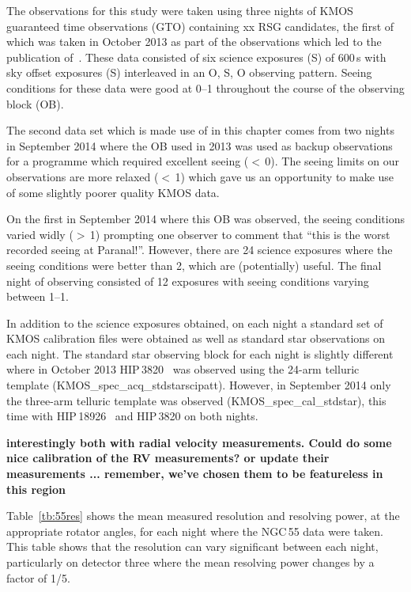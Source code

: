 The observations for this study were taken using three nights of KMOS guaranteed time observations (GTO) containing xx RSG candidates, the first of which was taken in October 2013 as part of the observations which led to the publication of~\cite{2015ApJ...805..182G}.
These data consisted of six science exposures (S) of 600\,s with sky offset exposures (S) interleaved in an O, S, O observing pattern.
Seeing conditions for these data were good at 0--1 throughout the course of the observing block (OB).

The second data set which is made use of in this chapter comes from two nights in September 2014 where the OB used in 2013 was used as backup observations for a programme which required excellent seeing ($<$\,0).
The seeing limits on our observations are more relaxed ($<$\,1) which gave us an opportunity to make use of some slightly poorer quality KMOS data.

On the first in September 2014 where this OB was observed, the seeing conditions varied widly ($>$\,1) prompting one observer to comment that ``this is the worst recorded seeing at Paranal!''.
However, there are 24 science exposures where the seeing conditions were better than 2, which are (potentially) useful.
The final night of observing consisted of 12 exposures with seeing conditions varying between 1--1.

In addition to the science exposures obtained, on each night a standard set of KMOS calibration files were obtained as well as standard star observations on each night.
The standard star observing block for each night is slightly different where in October 2013 HIP\,3820~\citep[B8\,V;]{1978mcts.book.....H} was observed using the 24-arm telluric template (KMOS\_spec\_acq\_stdstarscipatt).
However, in September 2014 only the three-arm telluric template was observed (KMOS\_spec\_cal\_stdstar), this time with HIP\,18926~\citep[B3\,V;]{1988mcts.book.....H} and HIP\,3820 on both nights.

\textbf{interestingly both with radial velocity measurements. Could do some nice calibration of the RV measurements? or update their measurements ... remember, we've chosen them to be featureless in this region}

Table~\ref{tb:55res} shows the mean measured resolution and resolving power, at the appropriate rotator angles, for each night where the NGC\,55 data were taken.
This table shows that the resolution can vary significant between each night, particularly on detector three where the mean resolving power changes by a factor of 1/5.

